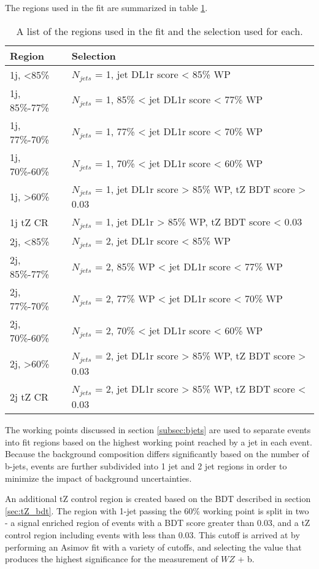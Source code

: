 
The regions used in the fit are summarized in table \ref{tab:regions}.

\begin{table}[h]
\centering
\caption{A list of the regions used in the fit and the selection used for each.}
\begin{tabular}{l|l}
\hline\hline
Region & Selection  	      \\
\hline
\hline
1j, <85\%	& $N_{jets}$ = 1, jet DL1r score < 85\%	WP	      \\
1j, 85\%-77\%	& $N_{jets}$ = 1, 85\% < jet DL1r score < 77\% WP 		      \\
1j, 77\%-70\%	& $N_{jets}$ = 1, 77\% < jet DL1r score < 70\% WP		      \\
1j, 70\%-60\%	& $N_{jets}$ = 1, 70\% < jet DL1r score < 60\% WP		      \\
1j, >60\%	& $N_{jets}$ = 1, jet DL1r score > 85\% WP, tZ BDT score > 0.03 \\
1j tZ CR	& $N_{jets}$ = 1, jet DL1r > 85\% WP, tZ BDT score < 0.03 \\
2j, <85\%	& $N_{jets}$ = 2, jet DL1r score < 85\% WP		      \\
2j, 85\%-77\%	& $N_{jets}$ = 2, 85\% WP < jet DL1r score < 77\% WP		      \\
2j, 77\%-70\%	& $N_{jets}$ = 2, 77\% WP < jet DL1r score < 70\% WP		      \\
2j, 70\%-60\%   & $N_{jets}$ = 2, 70\% < jet DL1r score < 60\% WP                     \\                                    
2j, >60\%       & $N_{jets}$ = 2, jet DL1r score > 85\% WP, tZ BDT score > 0.03 \\                                          
2j tZ CR        & $N_{jets}$ = 2, jet DL1r score > 85\% WP, tZ BDT score < 0.03 \\
\hline\hline
\end{tabular}
\label{tab:regions}
\end{table}

The working points discussed in section \ref{subsec:bjets} are used to separate events into fit regions based on the highest working point reached by a jet in each event. Because the background composition differs significantly based on the number of b-jets, events are further subdivided into 1 jet and 2 jet regions in order to minimize the impact of background uncertainties. 

An additional tZ control region is created based on the BDT described in section \ref{sec:tZ_bdt}. The region with 1-jet passing the 60\% working point is split in two - a signal enriched region of events with a BDT score greater than 0.03, and a tZ control region including events with less than 0.03. This cutoff is arrived at by performing an Asimov fit with a variety of cutoffs, and selecting the value that produces the highest significance for the measurement of $WZ$ + b. 

